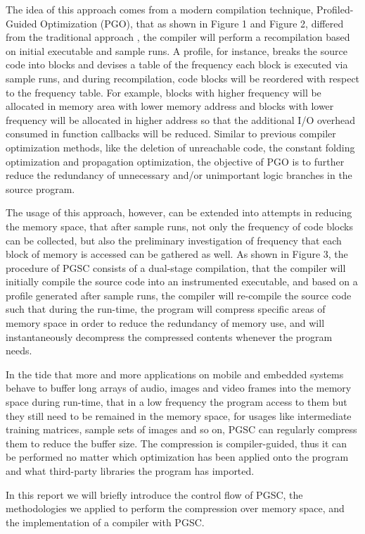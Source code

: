 \documentclass[]{article}
\begin{document}
The idea of this approach comes from a modern compilation technique, Profiled-Guided Optimization (PGO), that as shown in Figure 1 and Figure 2, differed from the traditional approach \cite{CompilerDesign}, the compiler will perform a recompilation based on initial executable and sample runs. A profile, for instance, breaks the source code into blocks and devises a table of the frequency each block is executed via sample runs, and during recompilation, code blocks will be reordered with respect to the frequency table. For example, blocks with higher frequency will be allocated in memory area with lower memory address and blocks with lower frequency will be allocated in higher address so that the additional I/O overhead consumed in function callbacks will be reduced. Similar to previous compiler optimization methods, like the deletion of unreachable code, the constant folding optimization and propagation optimization, the objective of PGO is to further reduce the redundancy of unnecessary and/or unimportant logic branches in the source program. \par 
The usage of this approach, however, can be extended into attempts in reducing the memory space, that after sample runs, not only the frequency of code blocks can be collected, but also the preliminary investigation of frequency that each block of memory is accessed can be gathered as well. As shown in Figure 3, the procedure of PGSC consists of a dual-stage compilation, that the compiler will initially compile the source code into an instrumented executable, and based on a profile generated after sample runs, the compiler will re-compile the source code such that during the run-time, the program will compress specific areas of memory space in order to reduce the redundancy of memory use, and will instantaneously decompress the compressed contents whenever the program needs. \par 
In the tide that more and more applications on mobile and embedded systems behave to buffer long arrays of audio, images and video frames into the memory space during run-time, that in a low frequency the program access to them but they still need to be remained in the memory space, for usages like intermediate training matrices, sample sets of images and so on, PGSC can regularly compress them to reduce the buffer size. The compression is compiler-guided, thus it can be performed no matter which optimization has been applied onto the program and what third-party libraries the program has imported. \par 
In this report we will briefly introduce the control flow of PGSC, the methodologies we applied to perform the compression over memory space, and the implementation of a compiler with PGSC. 
\end{document}
